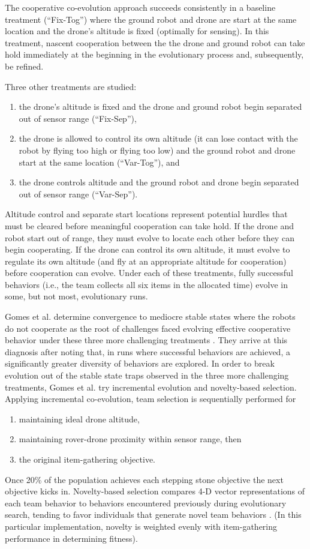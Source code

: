 The cooperative co-evolution approach succeeds consistently in a baseline treatment (``Fix-Tog'') where the ground robot and drone are start at the same location and the drone's altitude is fixed (optimally for sensing).
In this treatment, nascent cooperation between the the drone and ground robot can take hold immediately at the beginning in the evolutionary process and, subsequently, be refined.

Three other treatments are studied:
\begin{enumerate}
\item the drone's altitude is fixed and the drone and ground robot begin separated out of sensor range (``Fix-Sep''),
\item the drone is allowed to control its own altitude (it can lose contact with the robot by flying too high or flying too low) and the ground robot and drone start at the same location (``Var-Tog''), and
\item the drone controls altitude and the ground robot and drone begin separated out of sensor range (``Var-Sep'').
\end{enumerate}
Altitude control and separate start locations represent potential hurdles that must be cleared before meaningful cooperation can take hold.
If the drone and robot start out of range, they must evolve to locate each other before they can begin cooperating.
If the drone can control its own altitude, it must evolve to regulate its own altitude (and fly at an appropriate altitude for cooperation) before cooperation can evolve.
Under each of these treatments, fully successful behaviors (i.e., the team collects all six items in the allocated time) evolve in some, but not most, evolutionary runs.

Gomes et al. determine convergence to mediocre stable states where the robots do not cooperate as the root of challenges faced evolving effective cooperative behavior under these three more challenging treatments \cite{panait2010theoretical}.
They arrive at this diagnosis after noting that, in runs where successful behaviors are achieved, a significantly greater diversity of behaviors are explored.
In order to break evolution out of the stable state traps observed in the three more challenging treatments, Gomes et al. try incremental evolution and novelty-based selection.
Applying incremental co-evolution, team selection is sequentially performed for
\begin{enumerate}
\item maintaining ideal drone altitude,
\item maintaining rover-drone proximity within sensor range, then
\item the original item-gathering objective.
\end{enumerate}
Once 20\% of the population achieves each stepping stone objective the next objective kicks in.
Novelty-based selection compares 4-D vector representations of each team behavior to behaviors encountered previously during evolutionary search, tending to favor individuals that generate novel team behaviors \cite{lehman2008exploiting}.
(In this particular implementation, novelty is weighted evenly with item-gathering performance in determining fitness).

